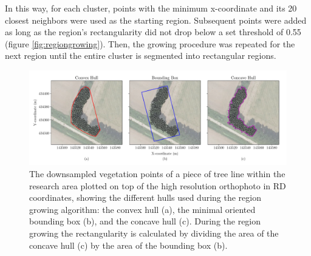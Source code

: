In this way, for each cluster, points with the minimum x-coordinate and its 20 closest neighbors were used as the starting region. Subsequent points were added as long as the region’s rectangularity did not drop below a set threshold of 0.55 (figure \ref{fig:regiongrowing}). Then, the growing procedure was repeated for the next region until the entire cluster is segmented into rectangular regions.


\begin{figure}
	\centering
	\includegraphics[width=\columnwidth]{./img/hulls.pdf}
	\caption{The downsampled vegetation points of a piece of tree line within the research area  plotted on top of the high resolution orthophoto in RD coordinates, showing the different hulls used during the region growing algorithm: the convex hull (a), the minimal oriented bounding box (b), and the concave hull (c). During the region growing the rectangularity is calculated by dividing the area of the concave hull (c) by the area of the bounding box (b).}
	\label{fig:hulls}
\end{figure}

